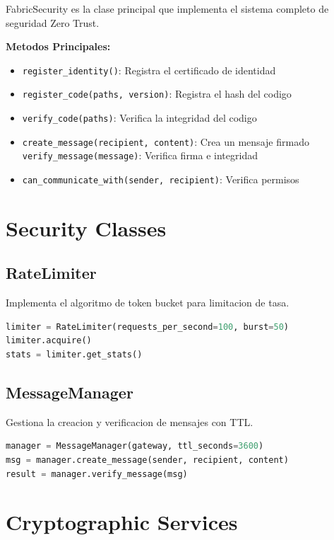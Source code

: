 \documentclass[12pt,a4paper]{report}
\newcommand{\class}[1]{\textsf{#1}}
\newcommand{\method}[1]{\texttt{#1}}
\begin{document}
\class{FabricSecurity} es la clase principal que implementa el sistema completo de seguridad Zero Trust.

\textbf{Metodos Principales:}

\begin{itemize}
    \item \method{register\_identity()}: Registra el certificado de identidad
    \item \method{register\_code(paths, version)}: Registra el hash del codigo
    \item \method{verify\_code(paths)}: Verifica la integridad del codigo
    \item \method{create\_message(recipient, content)}: Crea un mensaje firmado
    \method{verify\_message(message)}: Verifica firma e integridad
    \item \method{can\_communicate\_with(sender, recipient)}: Verifica permisos
\end{itemize}

\section{Security Classes}

\subsection{RateLimiter}

Implementa el algoritmo de token bucket para limitacion de tasa.

\begin{lstlisting}[language=python, caption={RateLimiter Usage}]
limiter = RateLimiter(requests_per_second=100, burst=50)
limiter.acquire()
stats = limiter.get_stats()
\end{lstlisting}

\subsection{MessageManager}

Gestiona la creacion y verificacion de mensajes con TTL.

\begin{lstlisting}[language=python, caption={MessageManager Usage}]
manager = MessageManager(gateway, ttl_seconds=3600)
msg = manager.create_message(sender, recipient, content)
result = manager.verify_message(msg)
\end{lstlisting}

\section{Cryptographic Services}
\end{document}
